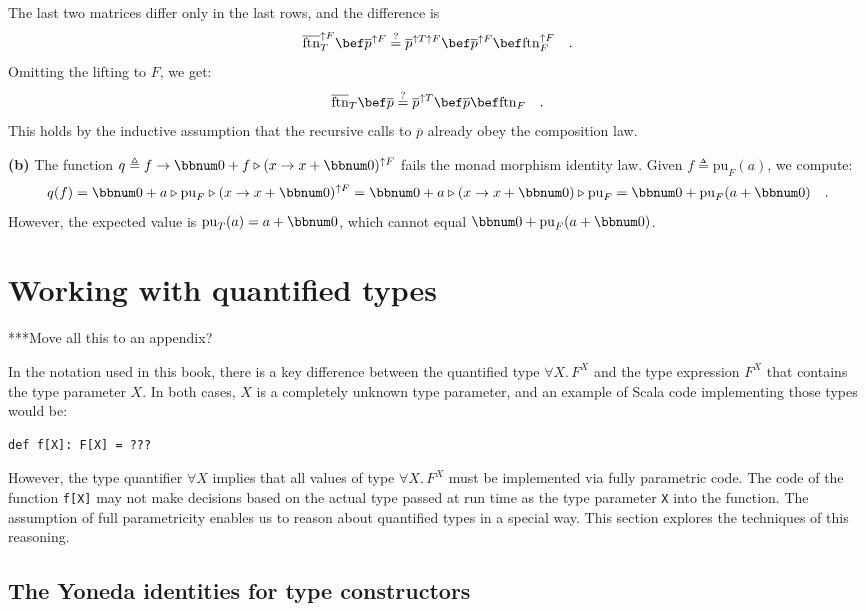 The last two matrices differ only in the last rows, and the difference
is
\[
\overline{\text{ftn}}_{T}^{\uparrow F}\bef\overline{p}^{\uparrow F}\overset{?}{=}\overline{p}^{\uparrow T\uparrow F}\bef\overline{p}^{\uparrow F}\bef\text{ftn}_{F}^{\uparrow F}\quad.
\]
Omitting the lifting to $F$, we get:
\[
\overline{\text{ftn}}_{T}\bef\overline{p}\overset{?}{=}\overline{p}^{\uparrow T}\bef\overline{p}\bef\text{ftn}_{F}\quad.
\]
This holds by the inductive assumption that the recursive calls to
$\overline{p}$ already obey the composition law.

\textbf{(b)} The function $q\triangleq f\rightarrow\bbnum 0+f\triangleright(x\rightarrow x+\bbnum 0)^{\uparrow F}$
fails the monad morphism identity law. Given $f\triangleq\text{pu}_{F}(a)$,
we compute: 
\[
q(f)=\bbnum 0+a\triangleright\text{pu}_{F}\triangleright(x\rightarrow x+\bbnum 0)^{\uparrow F}=\bbnum 0+a\triangleright(x\rightarrow x+\bbnum 0)\triangleright\text{pu}_{F}=\bbnum 0+\text{pu}_{F}(a+\bbnum 0)\quad.
\]
However, the expected value is $\text{pu}_{T}(a)=a+\bbnum 0$, which
cannot equal  $\bbnum 0+\text{pu}_{F}(a+\bbnum 0)$.

\section{Working with quantified types}

{*}{*}{*}Move all this to an appendix?

In the notation used in this book, there is a key difference between
the quantified type $\forall X.\,F^{X}$ and the type expression $F^{X}$
that contains the type parameter $X$. In both cases, $X$ is a completely
unknown type parameter, and an example of Scala code implementing
those types would be:
\begin{lstlisting}
def f[X]: F[X] = ???
\end{lstlisting}
However, the type quantifier $\forall X$ implies that all values
of type $\forall X.\,F^{X}$ must be implemented via fully parametric
code. The code of the function \lstinline!f[X]!
may not make decisions based on the actual type passed at run time
as the type parameter \lstinline!X!
into the function. The assumption of full parametricity enables us
to reason about quantified types in a special way. This section explores
the techniques of this reasoning.

\subsection{The Yoneda identities for type constructors}

